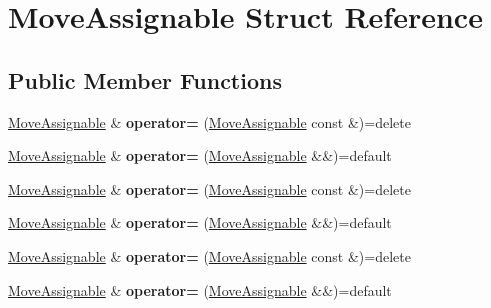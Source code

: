 \hypertarget{struct_move_assignable}{}\section{Move\+Assignable Struct Reference}
\label{struct_move_assignable}
\subsection*{Public Member Functions}
\begin{DoxyCompactItemize}
\item 
\mbox{\label{struct_move_assignable_af054e0089d7507ef81d5d35683621b5f}} 
\mbox{\hyperlink{struct_move_assignable}{Move\+Assignable}} \& {\bfseries operator=} (\mbox{\hyperlink{struct_move_assignable}{Move\+Assignable}} const \&)=delete
\item 
\mbox{\label{struct_move_assignable_aa98b1b46118db63859ddbed9da9737f4}} 
\mbox{\hyperlink{struct_move_assignable}{Move\+Assignable}} \& {\bfseries operator=} (\mbox{\hyperlink{struct_move_assignable}{Move\+Assignable}} \&\&)=default
\item 
\mbox{\label{struct_move_assignable_af054e0089d7507ef81d5d35683621b5f}} 
\mbox{\hyperlink{struct_move_assignable}{Move\+Assignable}} \& {\bfseries operator=} (\mbox{\hyperlink{struct_move_assignable}{Move\+Assignable}} const \&)=delete
\item 
\mbox{\label{struct_move_assignable_aa98b1b46118db63859ddbed9da9737f4}} 
\mbox{\hyperlink{struct_move_assignable}{Move\+Assignable}} \& {\bfseries operator=} (\mbox{\hyperlink{struct_move_assignable}{Move\+Assignable}} \&\&)=default
\item 
\mbox{\label{struct_move_assignable_af054e0089d7507ef81d5d35683621b5f}} 
\mbox{\hyperlink{struct_move_assignable}{Move\+Assignable}} \& {\bfseries operator=} (\mbox{\hyperlink{struct_move_assignable}{Move\+Assignable}} const \&)=delete
\item 
\mbox{\label{struct_move_assignable_aa98b1b46118db63859ddbed9da9737f4}} 
\mbox{\hyperlink{struct_move_assignable}{Move\+Assignable}} \& {\bfseries operator=} (\mbox{\hyperlink{struct_move_assignable}{Move\+Assignable}} \&\&)=default

\end{DoxyCompactItemize}
